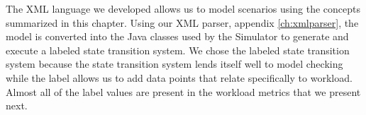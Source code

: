 The XML language we developed allows us to model scenarios using the concepts summarized in this chapter.  Using our XML parser, appendix \ref{ch:xmlparser}, the model is converted into the Java classes used by the Simulator to generate and execute a labeled state transition system.  We chose the labeled state transition system because the state transition system lends itself well to model checking while the label allows us to add data points that relate specifically to workload.  Almost all of the label values are present in the workload metrics that we present next.

